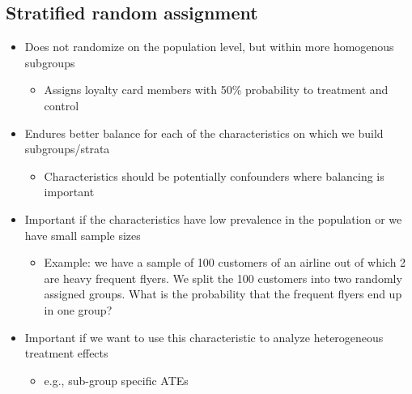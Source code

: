 \documentclass[10pt]{article}
\begin{document}
\subsection{Stratified random assignment}
\begin{itemize}
    \item Does not randomize on the population level, but within more homogenous subgroups
    \begin{itemize}
        \item Assigns loyalty card members with 50\% probability to treatment and control 
    \end{itemize}
    \item Endures better balance for each of the characteristics on which we build subgroups/strata
    \begin{itemize}
        \item Characteristics should be potentially confounders where balancing is important 
    \end{itemize}
    \item Important if the characteristics have low prevalence in the population or we have small sample sizes
    \begin{itemize}
        \item Example: we have a sample of 100 customers of an airline out of which 2 are heavy frequent flyers. We split the 100 customers into two randomly assigned groups. What is the probability that the frequent flyers end up in one group?
    \end{itemize}
    \item Important if we want to use this characteristic to analyze heterogeneous treatment effects 
    \begin{itemize}
        \item e.g., sub-group specific ATEs 
    \end{itemize}
\end{itemize}
\end{document}
